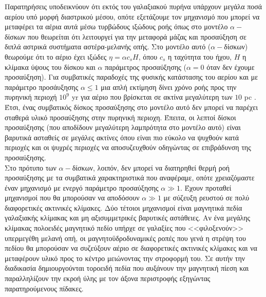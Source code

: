 Παρατηρήσεις υποδεικνύουν ότι εκτός του γαλαξιακού πυρήνα υπάρχουν μεγάλα ποσά αερίου υπό μορφή διαστρικού μέσου, οπότε εξετάζουμε τον μηχανισμό που μπορεί να μεταφέρει τα αέρια αυτά μέσω τυρβώδους ιξώδους ροής όπως στο μοντέλο $\alpha-$δίσκων που θεωρείται ότι λειτουργεί για την μεταφορά μάζας και προσαύξηση σε διπλά αστρικά συστήματα αστέρα-μελανής οπής. Στο μοντέλο αυτό ($\alpha-$δίσκων) θεωρούμε ότι το αέριο έχει ιξώδες $\eta = \alpha c_s H$, όπου $c_s$ η ταχύτητα του ήχου, $H$ η κλίμακα ύψους του δίσκου και $\alpha$ παράμετρος προσαύξησης ($\alpha=0$ όταν δεν έχουμε προσαύξηση). Για συμβατικές παραδοχές της φυσικής κατάστασης του αερίου και με παράμετρο προσάυξησης $\alpha \leq 1$ μια απλή εκτίμηση δίνει χρόνο ροής προς την πυρηνική περιοχή $10^9$ \textlatin{yr} για αέριο που βρίσκεται σε ακτίνα μεγαλύτερη των $10$ \textlatin{pc} \cite{AccrPower}. Έτσι, ένας συμβατικός δίσκος προσαύξησης στο μοντέλο αυτό δεν μπορεί να παρέχει σταθερά υλικό προσαύξησης στην πυρηνική περιοχη. Έπειτα, οι λεπτοί δίσκοι προσαύξησης (που αποδίδουν μεγαλύτερη λαμπρότητα στο μοντέλο αυτό) είναι βαρυτικά ασταθείς σε μεγάλες ακτίνες όπου είναι πιο εύκολο να ψυχθούν κατά περιοχές και οι ψυχρές περιοχές να αποσυζευχθούν οδηγώντας σε επιβράδυνση της προσαύξησης.\\
Στο πρότυπο των $\alpha-$δίσκων, λοιπόν, δεν μπορεί να διατηρηθεί θερμή ροή προσαύξησης με τα συμβατικά χαρακτηριστικά που αναφέραμε, οπότε χρειαζόμαστε έναν μηχανισμό με ενεργό παράμετρο προσαύξησης $\alpha \gg 1$. Έχουν προταθεί μηχανισμοί που θα μπορούσαν να αποδόσουν $\alpha \gg 1$ με σύζευξη ρευστού σε πολύ διαφορετικές ακτινικές κλίμακες. Δύο τέτοιοι μηχανισμοί είναι μαγνητικά πεδία γαλαξιακής κλίμακας και μη αξισυμμετρικές βαρυτικές αστάθειες. Αν ένα μεγάλης κλίμακας πολοειδές μαγνητικό πεδίο υπήρχε σε γαλαξίες που <<φιλοξενούν>> υπερμεγέθη μελανή οπή, οι μαγνητοϋδροδυναμικές ροπές που γενά η στρέψη του πεδίου θα μπορούσαν να συζεύξουν αέριο σε διαφορετικές ακτινικές κλίμακες και να μεταφέρουν υλικό προς το κέντρο μειώνοντας την στροφορμή του\cite{AccrPower}. Σε αυτήν την διαδικασία δημιουργούνται τοροειδή πεδία που αυξάνουν την μαγνητική πίεση και παραλληλίζουν την εκροή ύλης με τον άξονα περιστροφής εξηγώντας παρατηρούμενους πίδακες. %
